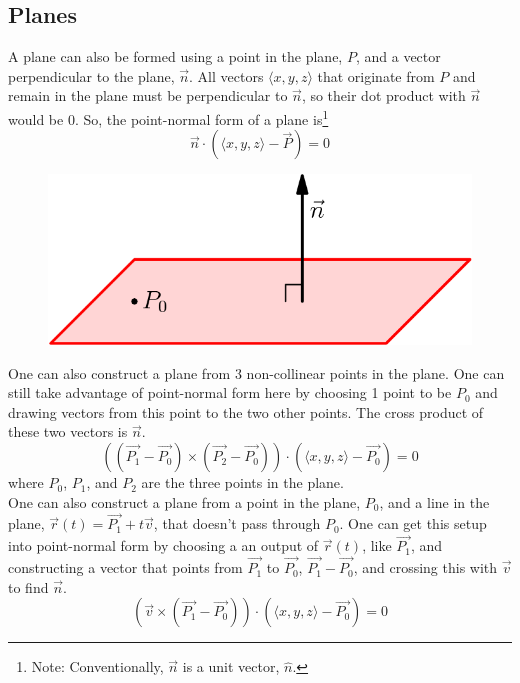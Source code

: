 \subsection{Planes}
\noindent
A plane can also be formed using a point in the plane, $P$, and a vector perpendicular to the plane, $\vec{n}$. All vectors $\langle x,y,z \rangle$ that originate from $P$ and remain in the plane must be perpendicular to $\vec{n}$, so their dot product with $\vec{n}$ would be 0. So, the point-normal form of a plane is\footnote{Note: Conventionally, $\vec{n}$ is a unit vector, $\hat{n}$.}
\begin{equation*}
	\vec{n}\cdot\left(\langle x,y,z \rangle - \vec{P}\right) = 0
\end{equation*}

\begin{figure}[h]
	\centering
	\includegraphics[scale=0.5]{Images/vectorValuedFunctions/PlaneNormalVector}
\end{figure}

\noindent
One can also construct a plane from 3 non-collinear points in the plane. One can still take advantage of point-normal form here by choosing 1 point to be $P_0$ and drawing vectors from this point to the two other points. The cross product of these two vectors is $\vec{n}$.
\begin{equation*}
	\left(\left(\vec{P_1} - \vec{P_0}\right) \times \left(\vec{P_2} - \vec{P_0}\right)\right) \cdot \left(\langle x,y,z \rangle - \vec{P_0}\right) = 0
\end{equation*}
where $P_0$, $P_1$, and $P_2$ are the three points in the plane.\\

\noindent
One can also construct a plane from a point in the plane, $P_0$, and a line in the plane, $\vec{r}(t) = \vec{P_1} + t\vec{v}$, that doesn't pass through $P_0$. One can get this setup into point-normal form by choosing a an output of $\vec{r}(t)$, like $\vec{P_1}$, and constructing a vector that points from $\vec{P_1}$ to $\vec{P_0}$, $\vec{P_1}-\vec{P_0}$, and crossing this with $\vec{v}$ to find $\vec{n}$.
\begin{equation*}
	\left(\vec{v} \times \left(\vec{P_1} - \vec{P_0}\right)\right) \cdot \left(\langle x,y,z \rangle - \vec{P_0}\right) = 0	
\end{equation*}

